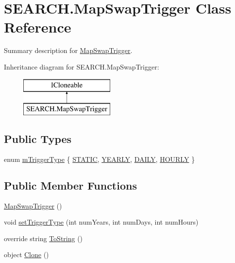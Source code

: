 \hypertarget{class_s_e_a_r_c_h_1_1_map_swap_trigger}{\section{S\-E\-A\-R\-C\-H.\-Map\-Swap\-Trigger Class Reference}
\label{class_s_e_a_r_c_h_1_1_map_swap_trigger}
}


Summary description for \hyperlink{class_s_e_a_r_c_h_1_1_map_swap_trigger}{Map\-Swap\-Trigger}.  


Inheritance diagram for S\-E\-A\-R\-C\-H.\-Map\-Swap\-Trigger\-:\begin{figure}[H]
\begin{center}
\leavevmode
\includegraphics[height=2.000000cm]{class_s_e_a_r_c_h_1_1_map_swap_trigger}
\end{center}
\end{figure}
\subsection*{Public Types}
\begin{DoxyCompactItemize}
\item 
enum \hyperlink{class_s_e_a_r_c_h_1_1_map_swap_trigger_a293d493ac648d62dd39a2be6a8f7ff57}{m\-Trigger\-Type} \{ \hyperlink{class_s_e_a_r_c_h_1_1_map_swap_trigger_a293d493ac648d62dd39a2be6a8f7ff57afe6f99ef1ec99efbdc19a9786cf1facc}{S\-T\-A\-T\-I\-C}, 
\hyperlink{class_s_e_a_r_c_h_1_1_map_swap_trigger_a293d493ac648d62dd39a2be6a8f7ff57ae50d62d1ede0a4ea1acb310ff6ca4d5b}{Y\-E\-A\-R\-L\-Y}, 
\hyperlink{class_s_e_a_r_c_h_1_1_map_swap_trigger_a293d493ac648d62dd39a2be6a8f7ff57a791490f9f4842958f00f3791f6c01576}{D\-A\-I\-L\-Y}, 
\hyperlink{class_s_e_a_r_c_h_1_1_map_swap_trigger_a293d493ac648d62dd39a2be6a8f7ff57abaf6ff95d32557260caa379339315a4e}{H\-O\-U\-R\-L\-Y}
 \}
\end{DoxyCompactItemize}
\subsection*{Public Member Functions}
\begin{DoxyCompactItemize}
\item 
\hyperlink{class_s_e_a_r_c_h_1_1_map_swap_trigger_acd8315f88c4ef336b80e21b3143d7cdc}{Map\-Swap\-Trigger} ()
\item 
void \hyperlink{class_s_e_a_r_c_h_1_1_map_swap_trigger_a499d2fc210489af641d60e94715bf950}{set\-Trigger\-Type} (int num\-Years, int num\-Days, int num\-Hours)
\item 
override string \hyperlink{class_s_e_a_r_c_h_1_1_map_swap_trigger_ace21b377dca11a89c3639e286251a6d4}{To\-String} ()
\item 
object \hyperlink{class_s_e_a_r_c_h_1_1_map_swap_trigger_ad61079f6e7cb69f1ba72c036fe1be792}{Clone} ()
\end{DoxyCompactItemize}
